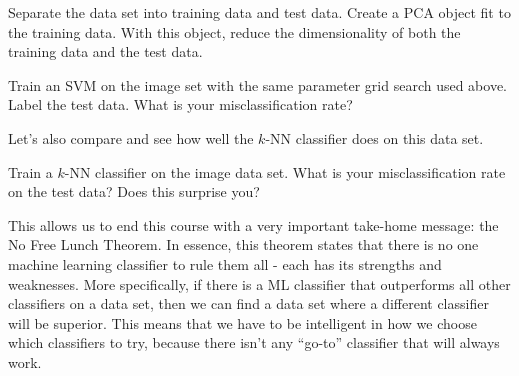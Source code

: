 \begin{problem}
Separate the data set into training data and test data. Create a PCA object fit to the training data. With this object, reduce the dimensionality of both the training data and the test data.
\end{problem}

\begin{problem}
Train an SVM on the image set with the same parameter grid search used above. Label the test data. What is your misclassification rate?
\end{problem}

Let's also compare and see how well the $k$-NN classifier does on this data set.

\begin{problem}
Train a $k$-NN classifier on the image data set. What is your misclassification rate on the test data? Does this surprise you?
\end{problem}

This allows us to end this course with a very important take-home message: the No Free Lunch Theorem. In essence, this theorem states that there is no one machine learning classifier to rule them all - each has its strengths and weaknesses. More specifically, if there is a ML classifier that outperforms all other classifiers on a data set, then we can find a data set where a different classifier will be superior. This means that we have to be intelligent in how we choose which classifiers to try, because there isn't any ``go-to'' classifier that will always work.
